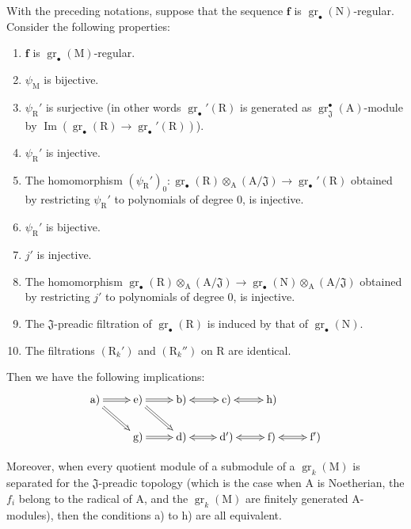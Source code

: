 \begin{proposition}[19.6.3]
\label{IV.19.6.3}
With the preceding notations, suppose that the sequence $\mathbf{f}$ is $\operatorname{gr}_\bullet(\mathrm{N})$-regular. Consider the following properties:
\begin{enumerate}
\item[\rm a)] $\mathbf{f}$ is $\operatorname{gr}_\bullet(\mathrm{M})$-regular.
\item[\rm b)] $\psi_\mathrm{M}$ is bijective.
\item[\rm c)] $\psi_\mathrm{R}'$ is surjective \textup{(in other words $\operatorname{gr}_\bullet'(\mathrm{R})$ is generated as $\operatorname{gr}_\mathfrak{J}^\bullet(\mathrm{A})$-module by $\operatorname{Im}(\operatorname{gr}_\bullet(\mathrm{R})\to\operatorname{gr}_\bullet'(\mathrm{R}))$)}.
\item[\rm d)] $\psi_\mathrm{R}'$ is injective.
\item[\rm \textup{d$'$)}] The homomorphism $(\psi_\mathrm{R}')_0:\operatorname{gr}_\bullet(\mathrm{R})\otimes_\mathrm{A}(\mathrm{A}/\mathfrak{J})\to\operatorname{gr}_\bullet'(\mathrm{R})$ obtained by restricting $\psi_\mathrm{R}'$ to polynomials of degree $0$, is injective.
\item[\rm e)] $\psi_\mathrm{R}'$ is bijective.
\item[\rm f)] $j'$ is injective.
\item[\rm \textup{f$'$)}] The homomorphism $\operatorname{gr}_\bullet(\mathrm{R})\otimes_\mathrm{A}(\mathrm{A}/\mathfrak{J})\to\operatorname{gr}_\bullet(\mathrm{N})\otimes_\mathrm{A}(\mathrm{A}/\mathfrak{J})$ obtained by restricting $j'$ to polynomials of degree $0$, is injective.
\item[\rm g)] The $\mathfrak{J}$-preadic filtration of $\operatorname{gr}_\bullet(\mathrm{R})$ is induced by that of $\operatorname{gr}_\bullet(\mathrm{N})$.
\item[\rm h)] The filtrations $(\mathrm{R}_k')$ and $(\mathrm{R}_k'')$ on $\mathrm{R}$ are identical.
\end{enumerate}
Then we have the following implications:
\[
\xymatrix@C=2.4em@R=1.8em{
  \textup{a)} \ar@{=>}[r] \ar@{=>}[dr] &
  \textup{e)} \ar@{=>}[r] \ar@{=>}[dr] &
  \textup{b)} \ar@{<=>}[r] &
  \textup{c)} \ar@{<=>}[r] &
  \textup{h)} \\
  & \textup{g)} \ar@{=>}[r] &
  \textup{d)} \ar@{<=>}[r] &
  \textup{d$'$)} \ar@{<=>}[r] &
  \textup{f)} \ar@{<=>}[r] &
  \textup{f$'$)}
}
\]

Moreover, when every quotient module of a submodule of a $\operatorname{gr}_k(\mathrm{M})$ is separated for the $\mathfrak{J}$-preadic topology \textup{(which is the case when $\mathrm{A}$ is Noetherian, the $f_i$ belong to the radical of $\mathrm{A}$, and the $\operatorname{gr}_k(\mathrm{M})$ are finitely generated $\mathrm{A}$-modules)}, then the conditions \textup{a)} to \textup{h)} are all equivalent.
\end{proposition}

